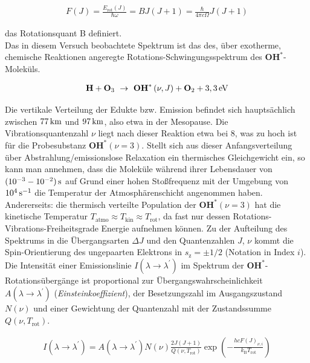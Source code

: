 \documentclass[numbers=noenddot,a4paper,notitlepage,twoside,BCOR15mm]{scrartcl}
\newcommand{\tenpo}[1]{ 10^{#1}}
\newcommand{\ix}[1]{_\text{#1}}
\newcommand{\tilt}[1]{\textit{#1}}
\newcommand{\fett}[1]{\textbf{#1}}
\begin{document}
			\begin{align}
				F\left(J\right)=\frac{E\ix{rot}\left(J\right)}{\hbar\omega}=BJ\left(J+1\right)=\frac{\hbar}{4\pi c\Omega}J\left(J+1\right)
			\end{align}

		das Rotationsquant B definiert.\\
		Das in diesem Versuch beobachtete Spektrum ist das des, über exotherme, chemische Reaktionen angeregte Rotations-Schwingungsspektrum des $\fett{OH}^\ast$-Moleküls.

			\begin{align}
				\fett{H}+\fett{O}\ix{3}\,\,\rightarrow\,\,\fett{OH}^\ast\left(\nu,J\right)+\fett{O}\ix{2}+\unit[3,3]{eV} \nonumber
			\end{align}

		Die vertikale Verteilung der Edukte bzw. Emission befindet sich hauptsächlich zwischen $\unit[77]{km}$ und $\unit[97]{km}$, also etwa in der Mesopause. Die Vibrationsquantenzahl $\nu$ liegt nach dieser Reaktion etwa bei 8, was zu hoch ist für die Probesubstanz $\fett{OH}^\ast\left(\nu=3\right)$. Stellt sich aus dieser Anfangsverteilung über Abstrahlung/emissionslose Relaxation ein thermisches Gleichgewicht ein, so kann man annehmen, dass die Moleküle während ihrer Lebensdauer von $\unit[(\tenpo{-3}-\tenpo{-2})]{s}$ auf Grund einer hohen Stoßfrequenz mit der Umgebung von $\unit[\tenpo{4}]{s^{-1}}$ die Temperatur der Atmosphärenschicht angenommen haben. Andererseits: die thermisch verteilte Population der $\fett{OH}^\ast\left(\nu=3\right)$ hat die kinetische Temperatur $T\ix{atmo}\approx T\ix{kin}\approx T\ix{rot}$, da fast nur dessen Rotations-Vibrations-Freiheitsgrade Energie aufnehmen können. Zu der Aufteilung des Spektrums in die Übergangsarten $\Delta J$ und den Quantenzahlen $J$, $\nu$ kommt die Spin-Orientierung des ungepaarten Elektrons in $s\ix{z}=\pm 1/2$ (Notation in Index $i$).
		Die Intensität einer Emissionslinie $I(\lambda\rightarrow\lambda^\prime)$ im Spektrum der $\fett{OH}^\ast$-Rotationsübergänge ist proportional zur Übergangswahrscheinlichkeit $A(\lambda\rightarrow\lambda^\prime)$ (\tilt{Einsteinkoeffizient}), der Besetzungszahl im Ausgangszustand $N(\nu)$ und einer Gewichtung der Quantenzahl mit der Zustandssumme $Q(\nu,T\ix{rot})$.

			\begin{align}
				I(\lambda\rightarrow\lambda^\prime)=A(\lambda\rightarrow\lambda^\prime)N(\nu)\frac{2J(J+1)}{Q(\nu,T\ix{rot})}\exp\left(-\frac{hcF(J)_{\nu,i}}{k\ix{B}T\ix{rot}}\right) \label{eq:intens}
			\end{align}
\end{document}
